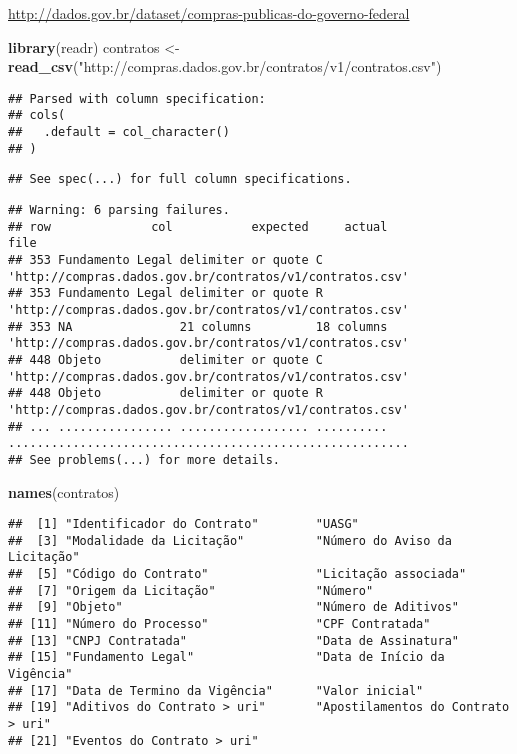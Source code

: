 \documentclass[]{article}
\newenvironment{Shaded}{\begin{snugshade}}{\end{snugshade}}
\newcommand{\KeywordTok}[1]{\textcolor[rgb]{0.13,0.29,0.53}{\textbf{#1}}}
\newcommand{\StringTok}[1]{\textcolor[rgb]{0.31,0.60,0.02}{#1}}
\newcommand{\NormalTok}[1]{#1}
\begin{document}
\url{http://dados.gov.br/dataset/compras-publicas-do-governo-federal}

\begin{Shaded}
\begin{Highlighting}[]
\KeywordTok{library}\NormalTok{(readr)}
\NormalTok{contratos <-}\StringTok{ }\KeywordTok{read_csv}\NormalTok{(}\StringTok{"http://compras.dados.gov.br/contratos/v1/contratos.csv"}\NormalTok{)}
\end{Highlighting}
\end{Shaded}

\begin{verbatim}
## Parsed with column specification:
## cols(
##   .default = col_character()
## )
\end{verbatim}

\begin{verbatim}
## See spec(...) for full column specifications.
\end{verbatim}

\begin{verbatim}
## Warning: 6 parsing failures.
## row              col           expected     actual                                                     file
## 353 Fundamento Legal delimiter or quote C          'http://compras.dados.gov.br/contratos/v1/contratos.csv'
## 353 Fundamento Legal delimiter or quote R          'http://compras.dados.gov.br/contratos/v1/contratos.csv'
## 353 NA               21 columns         18 columns 'http://compras.dados.gov.br/contratos/v1/contratos.csv'
## 448 Objeto           delimiter or quote C          'http://compras.dados.gov.br/contratos/v1/contratos.csv'
## 448 Objeto           delimiter or quote R          'http://compras.dados.gov.br/contratos/v1/contratos.csv'
## ... ................ .................. .......... ........................................................
## See problems(...) for more details.
\end{verbatim}

\begin{Shaded}
\begin{Highlighting}[]
\KeywordTok{names}\NormalTok{(contratos)}
\end{Highlighting}
\end{Shaded}

\begin{verbatim}
##  [1] "Identificador do Contrato"        "UASG"                            
##  [3] "Modalidade da Licitação"          "Número do Aviso da Licitação"    
##  [5] "Código do Contrato"               "Licitação associada"             
##  [7] "Origem da Licitação"              "Número"                          
##  [9] "Objeto"                           "Número de Aditivos"              
## [11] "Número do Processo"               "CPF Contratada"                  
## [13] "CNPJ Contratada"                  "Data de Assinatura"              
## [15] "Fundamento Legal"                 "Data de Início da Vigência"      
## [17] "Data de Termino da Vigência"      "Valor inicial"                   
## [19] "Aditivos do Contrato > uri"       "Apostilamentos do Contrato > uri"
## [21] "Eventos do Contrato > uri"
\end{verbatim}
\end{document}
